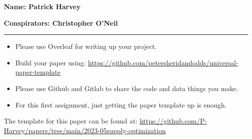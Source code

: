 \textbf{Name: Patrick Harvey} \\

\medskip

\textbf{Conspirators: Christopher O'Neil} 

\medskip
\medskip

\hrule

\medskip


\assignmentsonly{\pleasesubmitprojectdraft}

\begin{itemize}
\item 
  Please use Overleaf for writing up your project.
\item
  Build your paper using:
  \url{https://github.com/petersheridandodds/universal-paper-template}
\item
  Please use Github and Gitlab to share the code and data things you make.
\item
  For this first assignment, just getting the paper template up is enough.
\end{itemize}

\solutionstart

The template for this paper can be found at: \url{https://github.com/P-Harvey/papers/tree/main/2023-05supply-optimization}


\solutionend


